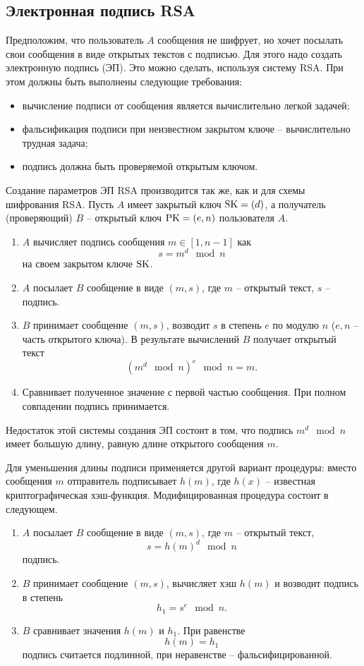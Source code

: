 \subsection[Электронная подпись]{Электронная подпись RSA}

Предположим, что пользователь $A$ сообщения не шифрует, но хочет посылать свои сообщения в виде открытых текстов с подписью. Для этого надо создать электронную подпись (ЭП). Это можно сделать, используя систему RSA. При этом должны быть выполнены следующие требования:
\begin{itemize}
    \item вычисление подписи от сообщения является вычислительно легкой задачей;
    \item фальсификация подписи при неизвестном закрытом ключе -- вычислительно трудная задача;
    \item подпись должна быть проверяемой открытым ключом.
\end{itemize}

Создание параметров ЭП RSA производится так же, как и для схемы шифрования RSA. Пусть  $A$ имеет закрытый ключ $\textrm{SK} = (d)$, а получатель (проверяющий) $B$ -- открытый ключ $\textrm{PK} = (e,n)$ пользователя $A$.

\begin{enumerate}
    \item $A$ вычисляет подпись сообщения $m \in [1,n-1]$ как
        \[ s = m^{d} \mod n \]
        на своем закрытом ключе $\textrm{SK}$.
    \item $A$ посылает $B$ сообщение в виде $(m, s)$, где $m$ -- открытый текст, $s$ -- подпись.
    \item $B$ принимает сообщение $(m, s)$, возводит $s$ в степень $e$ по модулю $n$ ($e, n$ -- часть открытого ключа). В результате вычислений $B$ получает открытый текст
        \[ \left( m^{d} \mod n \right)^{e} \mod n = m. \]
    \item Сравнивает полученное значение с первой частью сообщения. При полном совпадении подпись принимается.
\end{enumerate}
Недостаток этой системы создания ЭП состоит в том, что подпись $m^{d} \mod n$ имеет большую длину, равную длине открытого сообщения $m$.

Для уменьшения длины подписи применяется другой вариант процедуры: вместо сообщения $m$ отправитель подписывает $h(m)$, где $h(x)$ -- известная криптографическая хэш-функция. Модифицированная процедура состоит в следующем.

\begin{enumerate}
    \item $A$ посылает $B$ сообщение в виде $(m, s)$, где $m$ -- открытый текст,
        \[ s = h(m)^d \mod n \]
        подпись.
    \item $B$ принимает сообщение $(m, s)$, вычисляет хэш $h(m)$ и возводит подпись в степень
        \[ h_1 = s^e \mod n. \]
    \item $B$ сравнивает значения $h(m)$ и $h_1$. При равенстве
        \[ h(m) = h_1 \]
        подпись считается подлинной, при неравенстве -- фальсифицированной.
\end{enumerate}


